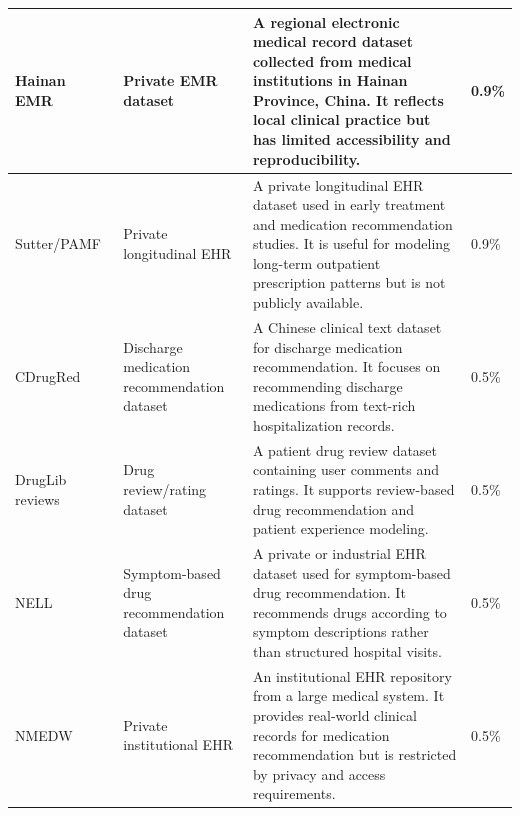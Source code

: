 \documentclass[manuscript,review]{acmart}
\begin{document}
\begin{table}[t]
{\begin{tabular}{p{3.2cm} p{3.2cm} p{7.4cm} p{2.2cm}}
Hainan EMR~\cite{lin2022mrkpa}
& Private EMR dataset
& A regional electronic medical record dataset collected from medical institutions in Hainan Province, China. It reflects local clinical practice but has limited accessibility and reproducibility.
& 0.9\% \\
\hline

Sutter/PAMF~\cite{choi2016doctorai}
& Private longitudinal EHR
& A private longitudinal EHR dataset used in early treatment and medication recommendation studies. It is useful for modeling long-term outpatient prescription patterns but is not publicly available.
& 0.9\% \\
\hline

CDrugRed~\cite{li2025cdrugred}
& Discharge medication recommendation dataset
& A Chinese clinical text dataset for discharge medication recommendation. It focuses on recommending discharge medications from text-rich hospitalization records.
& 0.5\% \\
\hline

DrugLib reviews~\cite{zomorodi2024recomed}
& Drug review/rating dataset
& A patient drug review dataset containing user comments and ratings. It supports review-based drug recommendation and patient experience modeling.
& 0.5\% \\
\hline

NELL~\cite{tan2022_4sdrug}
& Symptom-based drug recommendation dataset
& A private or industrial EHR dataset used for symptom-based drug recommendation. It recommends drugs according to symptom descriptions rather than structured hospital visits.
& 0.5\% \\
\hline

NMEDW~\cite{mao2022medgcn}
& Private institutional EHR
& An institutional EHR repository from a large medical system. It provides real-world clinical records for medication recommendation but is restricted by privacy and access requirements.
& 0.5\% \\
\hline

\end{tabular}
}
\end{table}



\end{document}
